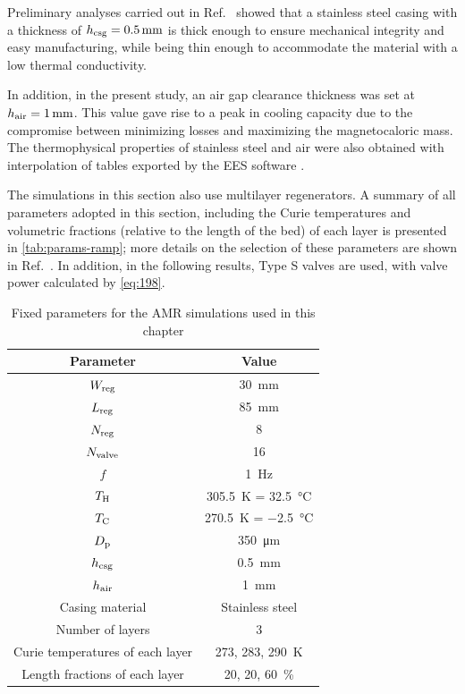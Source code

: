 \documentclass[referee]{svjour3}
\begin{document}

Preliminary analyses carried out in Ref.~\cite{bib:peixer17-perfor-amrs} showed that a stainless steel casing with a thickness of $h\ped{csg} = \SI{0.5}{\mm}$ is thick enough to ensure mechanical integrity and easy manufacturing, while being thin enough to accommodate the material with a low thermal conductivity.

In addition, in the present study, an air gap clearance thickness was set at $h\ped{air} = \SI{1}{\mm}$. This value gave rise to a peak in cooling capacity due to the compromise between minimizing losses and maximizing the magnetocaloric mass.  The thermophysical properties of stainless steel and air were also obtained with interpolation of tables exported by the EES software \cite{bib:klein13-ees}.

The simulations in this section also use multilayer regenerators. A summary of all parameters adopted in this section, including the Curie temperatures and volumetric fractions (relative to the length of the bed) of each layer is presented in \autoref{tab:params-ramp}; more details on the selection of these parameters are shown in Ref.~\cite{bib:neves18-numer-gd-y}. In addition, in the following results, Type S valves are used, with valve power calculated by \autoref{eq:198}.

\begin{table}[!ht]
  \centering
  \begin{tabular}{c|c}
\hline
    \textbf{Parameter} & \textbf{Value} \\
\hline
$W_{\mathrm{reg}}$ & \SI{30}{\mm} \\
$L_{\mathrm{reg}}$ & \SI{85}{\mm} \\
$N_{\mathrm{reg}}$ & \num{8} \\
$N_{\mathrm{valve}}$ & \num{16} \\
$f$ & \SI{1}{\hertz} \\
$T_{\mathrm{H}}$ & \SI{305.5}{\kelvin} = \SI{32.5}{\celsius} \\
$T_{\mathrm{C}}$ & \SI{270.5}{\kelvin} = \SI{-2.5}{\celsius} \\
$D_{\mathrm{p}}$ & \SI{350}{\micro\meter} \\
$h_{\mathrm{csg}}$ & \SI{0.5}{\mm} \\
$h_{\mathrm{air}}$ & \SI{1}{\mm} \\
Casing material & Stainless steel \\
Number of layers & \num{3} \\
Curie temperatures of each layer & \num{273}, \num{283}, \SI{290}{\kelvin} \\ 
Length fractions of each layer & \num{20}, \num{20}, \SI{60}{\percent}\\
\hline
  \end{tabular}
  \caption{Fixed parameters for the AMR simulations used in this chapter}
  \label{tab:params-ramp}
\end{table}
\end{document}
